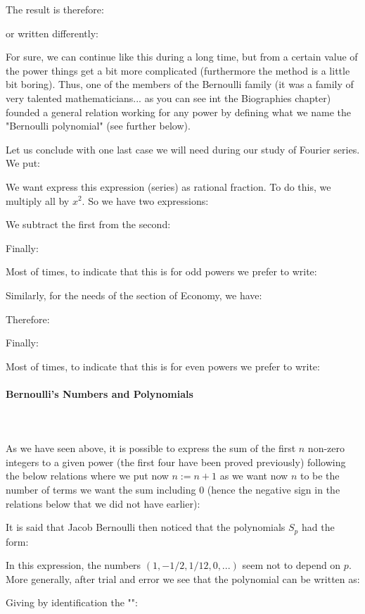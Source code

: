 	The result is therefore:
	
	or written differently:
	
	For sure, we can continue like this during a long time, but from a certain value of the power things get a bit more complicated (furthermore the method is a little bit boring). Thus, one of the members of the Bernoulli family (it was a family of very talented mathematicians... as you can see int the Biographies chapter) founded a general relation working for any power by defining what we name the "Bernoulli polynomial" (see further below).
	
	Let us conclude with one last case we will need during our study of Fourier series. We put:
	
	We want express this expression (series) as rational fraction. To do this, we multiply all by $x^2$. So we have two expressions:
	
	We subtract the first from the second:
	
	Finally:
	
	Most of times, to indicate that this is for odd powers we prefer to write:
	
	Similarly, for the needs of the section of Economy, we have:
	
	Therefore:
	
	Finally:
	
	Most of times, to indicate that this is for even powers we prefer to write:
	
	\paragraph{Bernoulli's Numbers and Polynomials}\mbox{}\\\\
	As we have seen above, it is possible to express the sum of the first $n$ non-zero integers to a given power (the first four have been proved previously) following the below relations where we put now $n:=n+1$ as we want now $n$ to be the number of terms we want the sum including 0 (hence the negative sign in the relations below that we did not have earlier):
	
	It is said that Jacob Bernoulli then noticed that the polynomials $S_p$ had the form:
	
	In this expression, the numbers $(1,-1/2,1/12,0,...)$ seem not to depend on $p$. More generally, after trial and error we see that the polynomial can be written as:
	
	Giving by identification the "":
	
